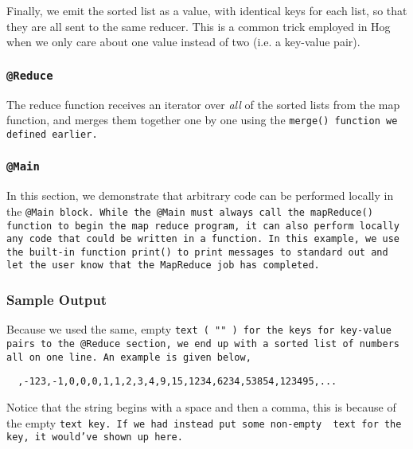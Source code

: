 \documentclass{article} \usepackage{fancyhdr, multicol}
\begin{document}
Finally, we emit the sorted list as a value, with identical keys for each list, so
that they are all sent to the same reducer. This is a common trick employed in Hog
when we only care about one value instead of two (i.e. a key-value pair).

\subsubsection*{\tt @Reduce \rm}

The reduce function receives an iterator over \emph{all} of the sorted lists from
the map function, and merges them together one by one using the \tt merge() \rm
function we defined earlier.

\subsubsection*{\tt @Main \rm}

In this section, we demonstrate that arbitrary code can be performed locally in the
\tt @Main \rm block. While the \tt @Main \rm must always call the \tt mapReduce()
\rm function to begin the map reduce program, it can also perform locally any code
that could be written in a function. In this example, we use the built-in function
\tt print() \rm to print messages to standard out and let the user know that the
MapReduce job has completed.

\subsubsection*{Sample Output}

Because we used the same, empty \tt text \rm ( \tt "" \rm) for the keys for
key-value pairs to the \tt @Reduce \rm section, we end up with a sorted list of
numbers all on one line. An example is given below,

\begin{verbatim}
  ,-123,-1,0,0,0,1,1,2,3,4,9,15,1234,6234,53854,123495,...
\end{verbatim}

\noindent Notice that the string begins with a space and then a comma, this is
because of the empty \tt text \rm key. If we had instead put some non-empty \tt
text \rm for the key, it would've shown up here.
\end{document}
